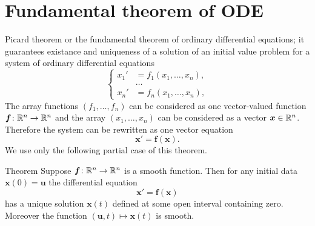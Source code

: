 \section*{Fundamental theorem of ODE}

Picard theorem or the fundamental theorem of ordinary differential equations;
it guarantees existance and uniqueness of a solution of an initial value problem
for a system of ordinary differential equations
\[
\left\{\begin{aligned}
x_1'&=f_1(x_1,\dots,x_n),
\\
&\dots
\\
x_n'&=f_n(x_1,\dots,x_n),
\end{aligned}
\right.
\]
The array functions $(f_1,\dots,f_n)$ can be considered as one vector-valued function 
$\bm{f}\colon\mathbb{R}^n\to \mathbb{R}^n$ and the array $(x_1,\dots,x_n)$ can be considered as a vector  $\bm{x}\in\mathbb{R}^n$.
Therefore the system can be rewritten as one vector equation 
\[\bm{x}'=\bm{f}(\bm{x}).\]
We use only the following partial case of this theorem. 

\begin{thm}{Theorem}
Suppose $\bm{f}\colon\mathbb{R}^n\to \mathbb{R}^n$ is a smooth function.
Then for any initial data $\bm{x}(0)=\bm{u}$ the differential equation 
\[\bm{x}'=\bm{f}(\bm{x})\]
has a unique solution $\bm{x}(t)$ defined at some open interval containing zero.
Moreover the function $(\bm{u},t)\mapsto \bm{x}(t)$ is smooth.
\end{thm}

